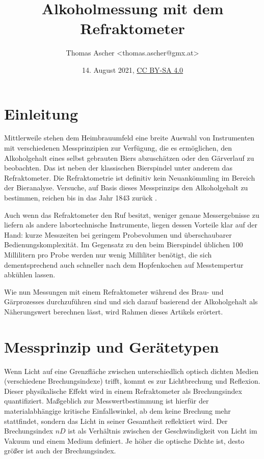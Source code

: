 \documentclass[a4paper,parskip=half]{scrartcl}
\title{Alkoholmessung mit dem Refraktometer}
\author{Thomas Ascher <thomas.ascher@gmx.at>}
\date{14. August 2021, \href{http://creativecommons.org/licenses/by-sa/4.0/}{CC BY-SA 4.0}}
\begin{document}
\maketitle

\section*{Einleitung}

Mittlerweile stehen dem Heimbrauumfeld eine breite Auswahl von Instrumenten
mit verschiedenen Messprinzipien zur Verfügung, die es ermöglichen, den
Alkoholgehalt eines selbst gebrauten Biers abzuschätzen oder den
Gärverlauf zu beobachten. Das ist neben der klassischen Bierspindel
unter anderem das Refraktometer. Die Refraktometrie ist
definitiv kein Neuankömmling im Bereich der Bieranalyse. Versuche,
auf Basis dieses Messprinzips den Alkoholgehalt zu bestimmen, reichen bis
in das Jahr 1843 zurück \autocite{Gamer1959}.

Auch wenn das Refraktometer den Ruf besitzt, weniger genaue Messergebnisse
zu liefern als andere labortechnische Instrumente, liegen dessen
Vorteile klar auf der Hand: kurze Messzeiten bei geringem Probevolumen
und überschaubarer Bedienungskomplexität. Im Gegensatz zu den beim
Bierspindel üblichen 100 Millilitern pro Probe werden nur wenig
Milliliter benötigt, die sich dementsprechend auch schneller nach dem
Hopfenkochen auf Messtempertur abkühlen lassen. \autocite{Bettner1969, Terrill2011}

Wie nun Messungen mit einem Refraktometer während des Brau- und
Gärprozesses durchzuführen sind und sich darauf basierend der
Alkoholgehalt als Näherungswert berechnen lässt, wird
Rahmen dieses Artikels erörtert.

\section*{Messprinzip und Gerätetypen}

Wenn Licht auf eine Grenzfläche zwischen unterschiedlich optisch
dichten Medien (verschiedene Brechungsindexe) trifft,
kommt es zur Lichtbrechung und Reflexion. Dieser physikalische Effekt
wird in einem Refraktometer als Brechungsindex quantifiziert.
Maßgeblich zur Messwertbestimmung ist hierfür der materialabhängige
kritische Einfallswinkel, ab dem keine Brechung mehr stattfindet,
sondern das Licht in seiner Gesamtheit reflektiert wird.
Der Brechungsindex \(\mathit{nD}\) ist als Verhältnis zwischen der
Geschwindigkeit von Licht im Vakuum und einem Medium definiert. Je höher
die optische Dichte ist, desto größer ist auch der Brechungsindex.
\autocite{AKRSSOGH2021,Bonham2001,Gamer1959}
\end{document}
